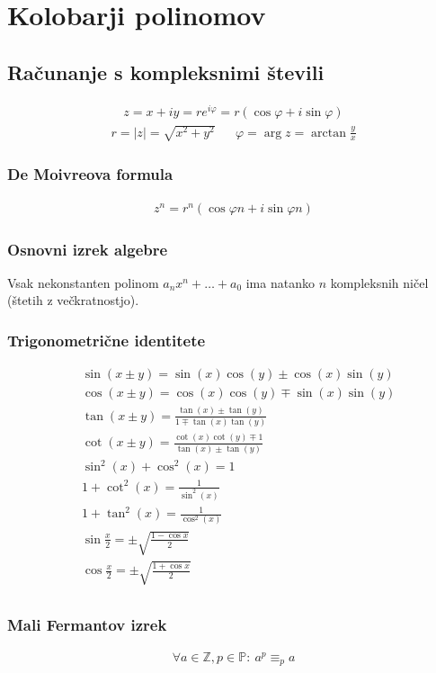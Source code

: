 

	\section{Kolobarji polinomov}
	\subsection{Računanje s kompleksnimi števili}
	\begin{gather*}
		z = x + iy = r e^{i\varphi} = r\left( \cos \varphi + i \sin \varphi \right)
	\end{gather*}
	\begin{align*}
		r = |z| = \sqrt{x^2 + y^2} && \varphi = \arg z = \arctan \frac{y}{x}
	\end{align*}

	\subsubsection*{De Moivreova formula}
	\begin{align*}
		z^n = r^n\left( \cos \varphi n + i \sin \varphi n \right)
	\end{align*}

	\subsubsection*{Osnovni izrek algebre}
	Vsak nekonstanten polinom $a_n x^n + \dots + a_0$ ima natanko $n$ kompleksnih ničel (štetih z večkratnostjo).

	\subsubsection*{Trigonometrične identitete}
	\begin{align*}
		&\sin(x \pm y) = \sin(x) \cos(y) \pm \cos(x) \sin(y) \\
		&\cos(x \pm y) = \cos(x) \cos(y) \mp \sin(x) \sin(y)\\
		&\tan(x \pm y) = \frac{\tan(x)\pm \tan(y)}{1 \mp \tan(x) \tan(y)}\\
		&\cot(x \pm y) = \frac{\cot(x)\cot(y) \mp 1}{\tan(x) \pm \tan(y)}\\
		&\sin^2(x)+\cos^2(x) = 1\\
		&1+\cot^2(x) = \frac{1}{\sin^2(x)}\\
		&1+\tan^2(x) = \frac{1}{\cos^2(x)}\\
		&\sin\frac{x}{2} = \pm\sqrt{\frac{1-\cos x}{2}}\\
		&\cos\frac{x}{2} = \pm\sqrt{\frac{1+\cos x}{2}}\\
	\end{align*}

	\subsubsection*{Mali Fermantov izrek}
	\begin{align}
		\forall a \in \mathbb{Z}, p \in \mathbb{P}:\ a^p \equiv_p a
	\end{align}
